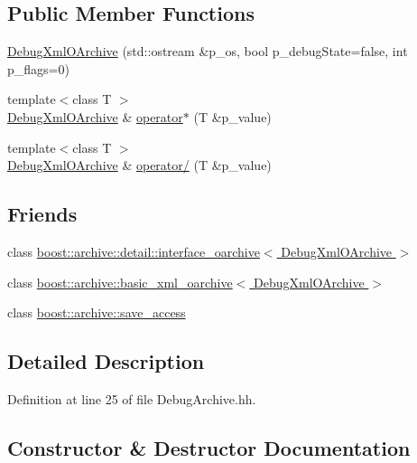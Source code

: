 \subsection*{Public Member Functions}
\begin{DoxyCompactItemize}
\item 
\hyperlink{classxtd_1_1serializer_1_1DebugXmlOArchive_aff4ee095fcc036756c7326731a15e9b7}{Debug\+Xml\+O\+Archive} (std\+::ostream \&p\+\_\+os, bool p\+\_\+debug\+State=false, int p\+\_\+flags=0)
\item 
{\footnotesize template$<$class T $>$ }\\\hyperlink{classxtd_1_1serializer_1_1DebugXmlOArchive}{Debug\+Xml\+O\+Archive} \& \hyperlink{classxtd_1_1serializer_1_1DebugXmlOArchive_a537495d2f70d2553edf308bafd0a6327}{operator$\ast$} (T \&p\+\_\+value)
\item 
{\footnotesize template$<$class T $>$ }\\\hyperlink{classxtd_1_1serializer_1_1DebugXmlOArchive}{Debug\+Xml\+O\+Archive} \& \hyperlink{classxtd_1_1serializer_1_1DebugXmlOArchive_a8e0706fca2bb1dd85556b537db740baf}{operator/} (T \&p\+\_\+value)
\end{DoxyCompactItemize}
\subsection*{Friends}
\begin{DoxyCompactItemize}
\item 
class \hyperlink{classxtd_1_1serializer_1_1DebugXmlOArchive_ade7e327f8089db178808693b17013b37}{boost\+::archive\+::detail\+::interface\+\_\+oarchive$<$ Debug\+Xml\+O\+Archive $>$}
\item 
class \hyperlink{classxtd_1_1serializer_1_1DebugXmlOArchive_ae9a53f0a6d08579fd714365dec459e66}{boost\+::archive\+::basic\+\_\+xml\+\_\+oarchive$<$ Debug\+Xml\+O\+Archive $>$}
\item 
class \hyperlink{classxtd_1_1serializer_1_1DebugXmlOArchive_aaca003bb8a4fc59424e4025130da4edd}{boost\+::archive\+::save\+\_\+access}
\end{DoxyCompactItemize}


\subsection{Detailed Description}


Definition at line 25 of file Debug\+Archive.\+hh.



\subsection{Constructor \& Destructor Documentation}
